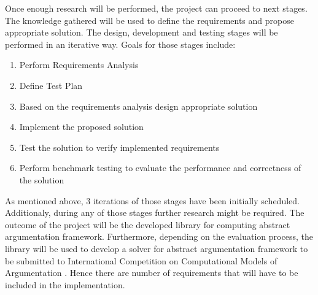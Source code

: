 Once enough research will be performed, the project can proceed to next stages. The knowledge gathered will be used to define the requirements and propose appropriate solution. The design, development and testing stages will be performed in an iterative way. Goals for those stages include:
\begin{enumerate}
	\item{Perform Requirements Analysis}
	\item{Define Test Plan}
	\item{Based on the requirements analysis design appropriate solution} 
	\item{Implement the proposed solution}
	\item{Test the solution to verify implemented requirements}
	\item{Perform benchmark testing to evaluate the performance and correctness of the solution}
\end{enumerate}
As mentioned above, 3 iterations of those stages have been initially scheduled. Additionaly, during any of those stages further research might be required. 
\newline
The outcome of the project will be the developed library for computing abstract argumentation framework. Furthermore, depending on the evaluation process, the library will be used to develop a solver for abstract argumentation framework to be submitted to International Competition on Computational Models of Argumentation \cite{ICCMA}. Hence there are number of requirements that will have to be included in the implementation.